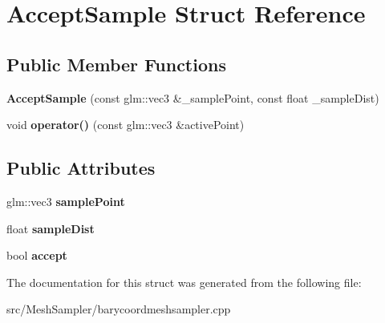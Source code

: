 \hypertarget{structAcceptSample}{}\section{Accept\+Sample Struct Reference}
\label{structAcceptSample}
\subsection*{Public Member Functions}
\begin{DoxyCompactItemize}
\item 
{\bfseries Accept\+Sample} (const glm\+::vec3 \&\+\_\+sample\+Point, const float \+\_\+sample\+Dist)\hypertarget{structAcceptSample_a6d4983e1995b909a6862ba83dac46787}{}\label{structAcceptSample_a6d4983e1995b909a6862ba83dac46787}

\item 
void {\bfseries operator()} (const glm\+::vec3 \&active\+Point)\hypertarget{structAcceptSample_a809f20fdef3ff8bd8d0acc3717bc5e1e}{}\label{structAcceptSample_a809f20fdef3ff8bd8d0acc3717bc5e1e}

\end{DoxyCompactItemize}
\subsection*{Public Attributes}
\begin{DoxyCompactItemize}
\item 
glm\+::vec3 {\bfseries sample\+Point}\hypertarget{structAcceptSample_aa30af1dd5a33ef5bc00dea9bd3bd1c88}{}\label{structAcceptSample_aa30af1dd5a33ef5bc00dea9bd3bd1c88}

\item 
float {\bfseries sample\+Dist}\hypertarget{structAcceptSample_a75dcc98726d5c91338b6d533fef7d940}{}\label{structAcceptSample_a75dcc98726d5c91338b6d533fef7d940}

\item 
bool {\bfseries accept}\hypertarget{structAcceptSample_a020e505dc47ff7e4841df4d04e662b12}{}\label{structAcceptSample_a020e505dc47ff7e4841df4d04e662b12}

\end{DoxyCompactItemize}


The documentation for this struct was generated from the following file\+:\begin{DoxyCompactItemize}
\item 
src/\+Mesh\+Sampler/barycoordmeshsampler.\+cpp\end{DoxyCompactItemize}
